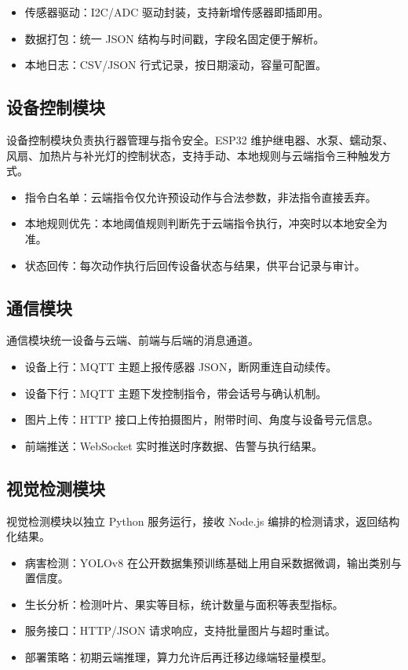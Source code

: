 \documentclass[11pt]{ctexart}
\begin{document}
\begin{itemize}
  \item 传感器驱动：I2C/ADC 驱动封装，支持新增传感器即插即用。
  \item 数据打包：统一 JSON 结构与时间戳，字段名固定便于解析。
  \item 本地日志：CSV/JSON 行式记录，按日期滚动，容量可配置。
\end{itemize}

\subsection{设备控制模块}
设备控制模块负责执行器管理与指令安全。ESP32 维护继电器、水泵、蠕动泵、风扇、加热片与补光灯的控制状态，支持手动、本地规则与云端指令三种触发方式。

\begin{itemize}
  \item 指令白名单：云端指令仅允许预设动作与合法参数，非法指令直接丢弃。
  \item 本地规则优先：本地阈值规则判断先于云端指令执行，冲突时以本地安全为准。
  \item 状态回传：每次动作执行后回传设备状态与结果，供平台记录与审计。
\end{itemize}

\subsection{通信模块}
通信模块统一设备与云端、前端与后端的消息通道。

\begin{itemize}
  \item 设备上行：MQTT 主题上报传感器 JSON，断网重连自动续传。
  \item 设备下行：MQTT 主题下发控制指令，带会话号与确认机制。
  \item 图片上传：HTTP 接口上传拍摄图片，附带时间、角度与设备号元信息。
  \item 前端推送：WebSocket 实时推送时序数据、告警与执行结果。
\end{itemize}

\subsection{视觉检测模块}
视觉检测模块以独立 Python 服务运行，接收 Node.js 编排的检测请求，返回结构化结果。

\begin{itemize}
  \item 病害检测：YOLOv8 在公开数据集预训练基础上用自采数据微调，输出类别与置信度。
  \item 生长分析：检测叶片、果实等目标，统计数量与面积等表型指标。
  \item 服务接口：HTTP/JSON 请求响应，支持批量图片与超时重试。
  \item 部署策略：初期云端推理，算力允许后再迁移边缘端轻量模型。
\end{itemize}
\end{document}
